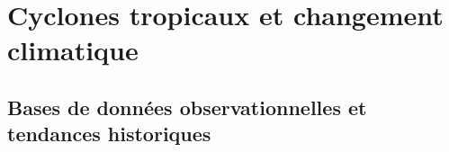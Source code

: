\documentclass[../main.tex]{subfiles}
\begin{document}
% 
% 
% 
% 

\section{Cyclones tropicaux et changement climatique}

\subsection{Bases de données observationnelles et tendances historiques}
\end{document}
